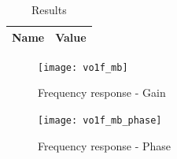 \begin{table}[H]
  \centering
  \begin{tabular}{|c|c|}
    \hline
        {\bf Name} & {\bf Value} \\
        \hline
        \hline
        
        \hline
  \end{tabular}
  \caption{Results}
  \label{sim_mb_results}
\end{table}

\begin{figure}[H]
\centering
\texttt{[image: vo1f\_mb]}
\caption{Frequency response - Gain}
\end{figure}

\begin{figure}[H]
\centering
\texttt{[image: vo1f\_mb\_phase]}
\caption{Frequency response - Phase}
\end{figure}
